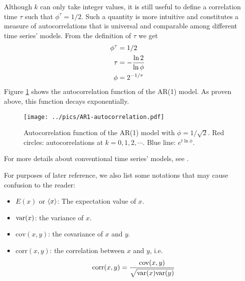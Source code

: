 \documentclass{book}
\begin{document}
\begin{itemize}
  Although $k$ can only take integer values, it is still useful to
  define a correlation time $\tau$ such that $\phi^\tau = 1/2$. Such a
  quantity is more intuitive and constitutes a measure of
  autocorrelations that is universal and comparable among different
  time series' models. From the definition of $\tau$ we get
  \begin{equation}
    \label{eq:tau_def}
    \begin{aligned}
      \phi^\tau &= 1/2 \\
      \tau &= -{\ln 2 \over \ln\phi} \\
      \phi &= 2^{-1/\tau}
    \end{aligned}
  \end{equation}
  Figure \ref{fig:AR1-autocorrelation} shows the autocorrelation
  function of the AR(1) model. As proven above, this function decays
  exponentially.
  \begin{figure}[htb!]
    \vspace{-15mm}
    \centering
    \texttt{[image: ../pics/AR1-autocorrelation.pdf]}
    \caption{\footnotesize Autocorrelation function of the AR(1) model
      with $\phi=1/\sqrt{2}$. Red circles: autocorrelations at $k=0, 1,
      2, \cdots$. Blue line: $e^{t\ln\phi}$.}
    \label{fig:AR1-autocorrelation}
  \end{figure}
  For more details about conventional time series' models, see
  \cite{BoxJenkins94}.
\end{itemize}

For purposes of later reference, we also list some notations that may
cause confusion to the reader:
\begin{itemize}
\item $E(x)$ or $\langle x\rangle$: The expectation value of $x$.
\item $\text{var}(x)$: the variance of $x$.
\item $\text{cov}(x,y)$: the covariance of $x$ and $y$.
\item $\text{corr}(x,y)$: the correlation between $x$ and $y$, i.e.
  \begin{equation*}
    \text{corr}(x,y) = {\text{cov}(x,y) \over \sqrt{\text{var}(x)\text{var}(y)}}
  \end{equation*}
\end{itemize}
\end{document}
